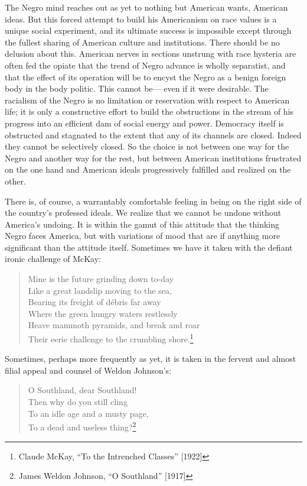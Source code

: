 \documentclass[12pt]{article}
\begin{document}
The Negro mind reaches out as yet to nothing but American wants, American ideas. But this forced attempt to build his Americanism on race values is a unique social experiment, and its ultimate success is impossible except through the fullest sharing of American culture and institutions. There should be no delusion about this. American nerves in sections unstrung with race hysteria are often fed the opiate that the trend of Negro advance is wholly separatist, and that the effect of its operation will be to encyst the Negro as a benign foreign body in the body politic. This cannot be--- even if it were desirable. The racialism of the Negro is no limitation or reservation with respect to American life; it is only a constructive effort to build the obstructions in the stream of his progress into an efficient dam of social energy and power. Democracy itself is obstructed and stagnated to the extent that any of its channels are closed. Indeed they cannot be selectively closed. So the choice is not between one way for the Negro and another way for the rest, but between American institutions frustrated on the one hand and American ideals progressively fulfilled and realized on the other.

There is, of course, a warrantably comfortable feeling in being on the right side of the country's professed ideals. We realize that we cannot be undone without America's undoing. It is within the gamut of this attitude that the thinking Negro faces America, but with variations of mood that are if anything more significant than the attitude itself. Sometimes we have it taken with the defiant ironic challenge of McKay:

\begin{quote}
   Mine is the future grinding down to-day\\
   Like a great landslip moving to the sea,\\
   Bearing its freight of débris far away\\
   Where the green hungry waters restlessly\\
   Heave mammoth pyramids, and break and roar\\
   Their eerie challenge to the crumbling shore.\footnote{Claude McKay, ``To the Intrenched Classes'' [1922]}
\end{quote}

Sometimes, perhaps more frequently as yet, it is taken in the fervent and almost filial appeal and counsel of Weldon Johnson's:

\begin{quote}
   O Southland, dear Southland!\\
   Then why do you still cling\\
   To an idle age and a musty page,\\
   To a dead and useless thing?\footnote{James Weldon Johnson, ``O Southland'' [1917]}
\end{quote}
\end{document}

